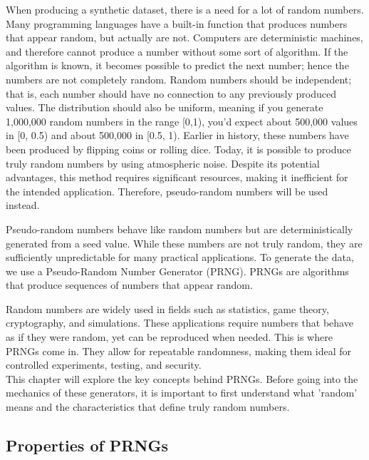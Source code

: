 When producing a synthetic dataset, there is a need for a lot of random numbers. Many programming languages have a built-in function that produces numbers that appear random, but actually are not. Computers are deterministic machines, and therefore cannot produce a number without some sort of algorithm. If the algorithm is known, it becomes possible to predict the next number; hence the numbers are not completely random. Random numbers should be independent; that is, each number should have no connection to any previously produced values. The distribution should also be uniform, meaning if you generate 1,000,000 random numbers in the range [0,1), you'd expect about 500,000 values in [0, 0.5) and about 500,000 in [0.5, 1). Earlier in history, these numbers have been produced by flipping coins or rolling dice. Today, it is possible to produce truly random numbers by using atmospheric noise. Despite its potential advantages, this method requires significant resources, making it inefficient for the intended application. Therefore, pseudo-random numbers will be used instead.
\newline

\noindent Pseudo-random numbers behave like random numbers but are deterministically generated from a seed value. While
these numbers are not truly random, they are sufficiently unpredictable for many practical applications.
To generate the data, we use a Pseudo-Random Number Generator (PRNG).
PRNGs are algorithms that produce sequences of numbers that appear random.
\newline

\noindent Random numbers are widely used in fields such as statistics, game theory, cryptography, and simulations. These applications require numbers that behave
as if they were random, yet can be reproduced when needed. This is where
PRNGs come in. They allow for repeatable randomness, making them ideal for
controlled experiments, testing, and security.
\\
This chapter will explore the key concepts behind PRNGs. Before going into the
mechanics of these generators, it is important to first understand what ’random’
means and the characteristics that define truly random numbers.

\subsection{Properties of PRNGs}

